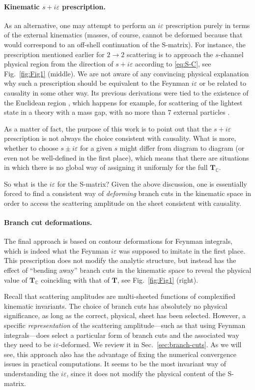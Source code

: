 \documentclass[12pt]{article}
\numberwithin{figure}{section}
\def \C {\mathbb{C}}
\def \eps {\varepsilon}
\def \T {\mathbf{T}}
\begin{document}
	\paragraph{Kinematic $s+i\eps$ prescription.} As an alternative, one may attempt to perform an $i\eps$ prescription purely in terms of the external kinematics (masses, of course, cannot be deformed because that would correspond to an off-shell continuation of the S-matrix). For instance, the prescription mentioned earlier for $2\to 2$ scattering is to approach the $s$-channel physical region from the direction of $s+i\eps$ according to \eqref{eq:S-C}, see Fig.~\ref{fig:Fig1} (middle).
	We are not aware of any convincing physical explanation why such a prescription should be equivalent to the Feynman $i\eps$ or be related to causality in some other way. Its previous derivations were tied to the existence of the Euclidean region \cite{Wu:1961zz,Eden:1966dnq}, which happens for example, for scattering of the lightest state in a theory with a mass gap, with no more than $7$ external particles \cite{Mizera:2021ujs}.

	
	As a matter of fact, the purpose of this work is to point out that the $s + i\eps$ prescription is not always the choice consistent with causality. What is more, whether to choose $s \pm i\eps$ for a given $s$ might differ from diagram to diagram (or even not be well-defined in the first place), which means that there are situations in which there is no global way of assigning it uniformly for the full $\T_\C$.
	
	
	So what is the $i\eps$ for the S-matrix? Given the above discussion, one is essentially forced to find a consistent way of \emph{deforming} branch cuts in the kinematic space in order to access the scattering amplitude on the sheet consistent with causality.
	
	\paragraph{Branch cut deformations.}
	The final approach is based on contour deformations for Feynman integrals, which is indeed what the Feynman $i\eps$ was supposed to imitate in the first place. This prescription does not modify the analytic structure, but instead has the effect of ``bending away'' branch cuts in the kinematic space to reveal the physical value of $\T_\C$ coinciding with that of $\T$, see Fig.~\ref{fig:Fig1} (right).
	
	Recall that scattering amplitudes are multi-sheeted functions of complexified kinematic invariants. The choice of branch cuts has absolutely no physical significance, as long as the correct, physical, sheet has been selected. However, a specific \emph{representation} of the scattering amplitude---such as that using Feynman integrals---does select a particular form of branch cuts and the associated way they need to be $i\eps$-deformed. We review it in Sec.~\ref{sec:branch-cuts}. As we will see, this approach also has the advantage of fixing the numerical convergence issues in practical computations. It seems to be the most invariant way of understanding the $i\eps$, since it does not modify the physical content of the S-matrix.
	
\end{document}
